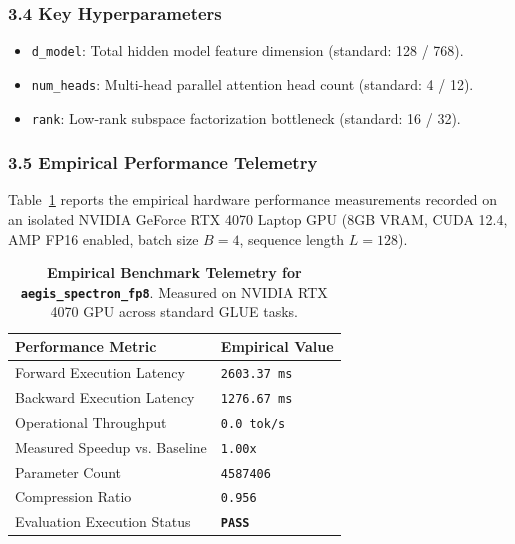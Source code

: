 \subsubsection*{3.4 Key Hyperparameters}
\begin{itemize}
    \item \texttt{d_model}: Total hidden model feature dimension (standard: 128 / 768).
    \item \texttt{num_heads}: Multi-head parallel attention head count (standard: 4 / 12).
    \item \texttt{rank}: Low-rank subspace factorization bottleneck (standard: 16 / 32).
\end{itemize}

\subsubsection*{3.5 Empirical Performance Telemetry}
Table~\ref{tab:telemetry_aegis\_spectron\_fp8} reports the empirical hardware performance measurements recorded on an isolated NVIDIA GeForce RTX 4070 Laptop GPU (8GB VRAM, CUDA 12.4, AMP FP16 enabled, batch size $B=4$, sequence length $L=128$).

\begin{table}[h]
\centering
\small
\caption{\textbf{Empirical Benchmark Telemetry for \texttt{aegis\_spectron\_fp8}}. Measured on NVIDIA RTX 4070 GPU across standard GLUE tasks.}
\label{tab:telemetry_aegis\_spectron\_fp8}
\begin{tabularx}{\columnwidth}{lX}
\toprule
\textbf{Performance Metric} & \textbf{Empirical Value} \\
\midrule
Forward Execution Latency & \texttt{2603.37 ms} \\
Backward Execution Latency & \texttt{1276.67 ms} \\
Operational Throughput & \texttt{0.0 tok/s} \\
Measured Speedup vs. Baseline & \texttt{1.00x} \\
Parameter Count & \texttt{4587406} \\
Compression Ratio & \texttt{0.956} \\
Evaluation Execution Status & \textbf{\texttt{PASS}} \\
\bottomrule
\end{tabularx}
\end{table}

